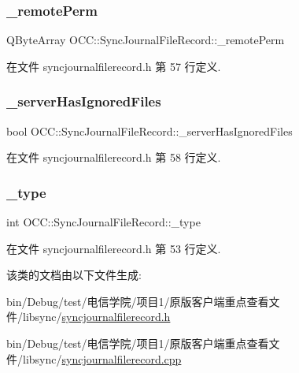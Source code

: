 \subsubsection{\texorpdfstring{\+\_\+remote\+Perm}{\_remotePerm}}
{\footnotesize\ttfamily Q\+Byte\+Array O\+C\+C\+::\+Sync\+Journal\+File\+Record\+::\+\_\+remote\+Perm}



在文件 syncjournalfilerecord.\+h 第 57 行定义.

\mbox{\label{class_o_c_c_1_1_sync_journal_file_record_aab1c42c017dc8f43da846f6d9817116a}} 
\subsubsection{\texorpdfstring{\+\_\+server\+Has\+Ignored\+Files}{\_serverHasIgnoredFiles}}
{\footnotesize\ttfamily bool O\+C\+C\+::\+Sync\+Journal\+File\+Record\+::\+\_\+server\+Has\+Ignored\+Files}



在文件 syncjournalfilerecord.\+h 第 58 行定义.

\mbox{\label{class_o_c_c_1_1_sync_journal_file_record_aae4f08d8802d5abe23a84d37812a06ee}} 
\subsubsection{\texorpdfstring{\+\_\+type}{\_type}}
{\footnotesize\ttfamily int O\+C\+C\+::\+Sync\+Journal\+File\+Record\+::\+\_\+type}



在文件 syncjournalfilerecord.\+h 第 53 行定义.



该类的文档由以下文件生成\+:\begin{DoxyCompactItemize}
\item 
bin/\+Debug/test/电信学院/项目1/原版客户端重点查看文件/libsync/\hyperlink{syncjournalfilerecord_8h}{syncjournalfilerecord.\+h}\item 
bin/\+Debug/test/电信学院/项目1/原版客户端重点查看文件/libsync/\hyperlink{syncjournalfilerecord_8cpp}{syncjournalfilerecord.\+cpp}\end{DoxyCompactItemize}
